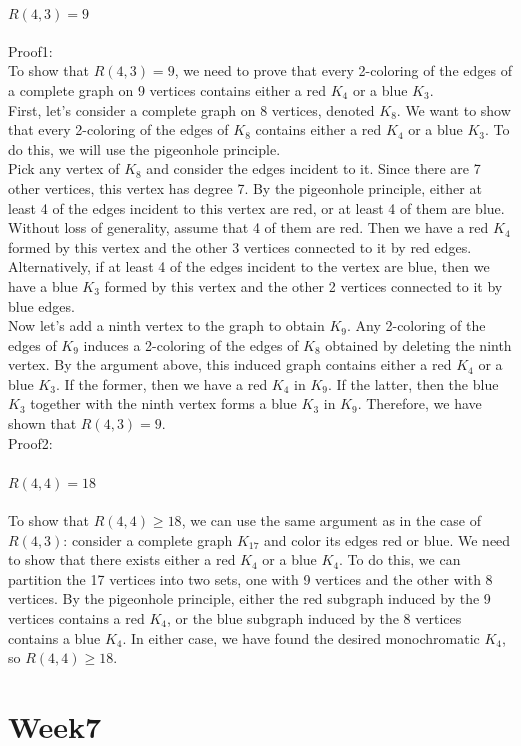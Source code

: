 \documentclass{article}
\begin{document}
\paragraph{$R(4, 3) = 9$}
Proof1:\\
To show that $R(4,3)=9$, we need to prove that every 2-coloring of the edges of a complete graph on 9 vertices contains either a red $K_4$ or a blue $K_3$.
\\
First, let's consider a complete graph on 8 vertices, denoted $K_8$. We want to show that every 2-coloring of the edges of $K_8$ contains either a red $K_4$ or a blue $K_3$. To do this, we will use the pigeonhole principle.
\\
Pick any vertex of $K_8$ and consider the edges incident to it. Since there are 7 other vertices, this vertex has degree 7. By the pigeonhole principle, either at least 4 of the edges incident to this vertex are red, or at least 4 of them are blue. Without loss of generality, assume that 4 of them are red. Then we have a red $K_4$ formed by this vertex and the other 3 vertices connected to it by red edges.
\\
Alternatively, if at least 4 of the edges incident to the vertex are blue, then we have a blue $K_3$ formed by this vertex and the other 2 vertices connected to it by blue edges.
\\
Now let's add a ninth vertex to the graph to obtain $K_9$. Any 2-coloring of the edges of $K_9$ induces a 2-coloring of the edges of $K_8$ obtained by deleting the ninth vertex. By the argument above, this induced graph contains either a red $K_4$ or a blue $K_3$. If the former, then we have a red $K_4$ in $K_9$. If the latter, then the blue $K_3$ together with the ninth vertex forms a blue $K_3$ in $K_9$. Therefore, we have shown that $R(4,3)=9$.\\
Proof2:\\

\paragraph{$R(4,4)=18$}
To show that $R(4,4) \ge 18$, we can use the same argument as in the case of $R(4,3)$: consider a complete graph $K_{17}$ and color its edges red or blue. We need to show that there exists either a red $K_4$ or a blue $K_4$. To do this, we can partition the 17 vertices into two sets, one with 9 vertices and the other with 8 vertices. By the pigeonhole principle, either the red subgraph induced by the 9 vertices contains a red $K_4$, or the blue subgraph induced by the 8 vertices contains a blue $K_4$. In either case, we have found the desired monochromatic $K_4$, so $R(4,4) \ge 18$.\\
\newpage \section{Week7}
\end{document}

